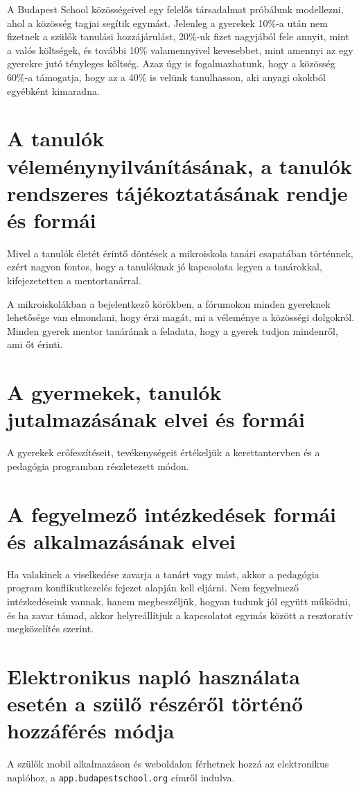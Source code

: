 \documentclass{article}
\begin{document}
A Budapest School közösségeivel egy felelős társadalmat próbálunk modellezni, ahol a közösség tagjai segítik egymást. Jelenleg a gyerekek 10\%-a után nem fizetnek a szülők tanulási hozzájárulást, 20\%-uk fizet nagyjából fele annyit, mint a valós költségek, és további 10\% valamennyivel kevesebbet, mint amennyi az egy gyerekre jutó tényleges költség. Azaz úgy is fogalmazhatunk, hogy a közösség 60\%-a támogatja, hogy az a 40\% is velünk tanulhasson, aki anyagi okokból egyébként kimaradna.

\section{A tanulók véleménynyilvánításának, a tanulók rendszeres tájékoztatásának rendje és formái}
Mivel a tanulók életét érintő döntések a mikroiskola tanári csapatában történnek, ezért nagyon fontos, hogy a tanulóknak jó kapcsolata legyen a tanárokkal, kifejezetetten a mentortanárral.

A mikroiskolákban a bejelentkező körökben, a fórumokon minden gyereknek lehetősége van elmondani, hogy érzi magát, mi a véleménye a közösségi dolgokról. Minden gyerek mentor tanárának a feladata, hogy a gyerek tudjon mindenről, ami őt érinti.


\section{A gyermekek, tanulók jutalmazásának elvei és formái}
A gyerekek erőfeszítéseit, tevékenységeit értékeljük a kerettantervben és a pedagógia programban részletezett módon.

\section{A fegyelmező intézkedések formái és alkalmazásának elvei}
Ha valakinek a viselkedése zavarja a tanárt vagy mást, akkor a pedagógia program konflikutkezelés fejezet alapján kell eljárni. Nem fegyelmező intézkedéseink vannak, hanem megbeszéljük, hogyan tudunk jól együtt működni, és ha zavar támad, akkor helyreállítjuk a kapcsolatot egymás között a resztoratív megközelítés szerint.

\section{Elektronikus napló használata esetén a szülő részéről történő hozzáférés módja}
A szülők mobil alkalmazáson és weboldalon férhetnek hozzá az elektronikus naplóhoz, a \texttt{app.budapestschool.org} címről indulva.
\end{document}
